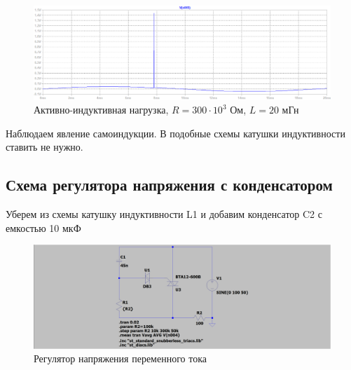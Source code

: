\documentclass[a4paper, 12pt]{article}
\begin{document}
    \begin{figure}[H]
        \centering
        \includegraphics[scale=0.45]{R2-300k_L20m.png}
        \captionsetup{skip=0pt}
        \caption{Активно-индуктивная нагрузка, $R=300\cdot10^3$ Ом, $L=20$ мГн}
        \label{fig:R2-300k_L20m}
    \end{figure}
    \noindent Наблюдаем явление самоиндукции. В подобные схемы катушки индуктивности ставить не нужно.


    \subsection{Схема регулятора напряжения с конденсатором}
    Уберем из схемы катушку индуктивности L1 и добавим конденсатор C2 с емкостью 10 мкФ
    \begin{figure}[H]
        \centering
        \includegraphics[scale=0.22]{scheme6.png}
        \captionsetup{skip=0pt}
        \caption{Регулятор напряжения переменного тока}
        \label{fig:scheme6}
    \end{figure}
\end{document}
